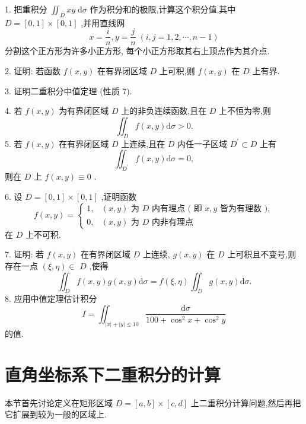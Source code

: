 1. 把重积分 \({\iint }_{D}{xy}\mathrm{\;d}\sigma\) 作为积分和的极限,计算这个积分值,其中 \(D = \left\lbrack  {0,1}\right\rbrack   \times  \left\lbrack  {0,1}\right\rbrack\) ,并用直线网
\[
x = \frac{i}{n},y = \frac{j}{n}\;\left( {i,j = 1,2,\cdots ,n - 1}\right)
\]
分割这个正方形为许多小正方形, 每个小正方形取其右上顶点作为其介点.

2. 证明: 若函数 \(f\left( {x,y}\right)\) 在有界闭区域 \(D\) 上可积,则 \(f\left( {x,y}\right)\) 在 \(D\) 上有界.

3. 证明二重积分中值定理 (性质 7).

4. 若 \(f\left( {x,y}\right)\) 为有界闭区域 \(D\) 上的非负连续函数,且在 \(D\) 上不恒为零,则
\[
{\iint }_{D}f\left( {x,y}\right) \mathrm{d}\sigma  > 0.
\]
5. 若 \(f\left( {x,y}\right)\) 在有界闭区域 \(D\) 上连续,且在 \(D\) 内任一子区域 \({D}^{\prime } \subset  D\) 上有
\[
{\iint }_{{D}^{\prime }}f\left( {x,y}\right) \mathrm{d}\sigma  = 0,
\]
则在 \(D\) 上 \(f\left( {x,y}\right)  \equiv  0\) .

6. 设 \(D = \left\lbrack  {0,1}\right\rbrack   \times  \left\lbrack  {0,1}\right\rbrack\) ,证明函数
\[
f\left( {x,y}\right)  = \left\{  \begin{array}{ll} 1, & \left( {x,y}\right) \text{ 为 }D\text{ 内有理点 ( 即 }x,y\text{ 皆为有理数 }), \\  0, & \left( {x,y}\right) \text{ 为 }D\text{ 内非有理点 } \end{array}\right.
\]
在 \(D\) 上不可积.

7. 证明: 若 \(f\left( {x,y}\right)\) 在有界闭区域 \(D\) 上连续, \(g\left( {x,y}\right)\) 在 \(D\) 上可积且不变号,则存在一点 \(\left( {\xi ,\eta }\right)  \in\)  \(D\) ,使得
\[
{\iint }_{D}f\left( {x,y}\right) g\left( {x,y}\right) \mathrm{d}\sigma  = f\left( {\xi ,\eta }\right) {\iint }_{D}g\left( {x,y}\right) \mathrm{d}\sigma .
\]
8. 应用中值定理估计积分
\[
I = {\iint }_{\left| x\right|  + \left| y\right|  \leq  {10}}\frac{\mathrm{d}\sigma }{{100} + {\cos }^{2}x + {\cos }^{2}y}
\]
的值.

\section{直角坐标系下二重积分的计算}

本节首先讨论定义在矩形区域 \(D = \left\lbrack  {a,b}\right\rbrack   \times  \left\lbrack  {c,d}\right\rbrack\) 上二重积分计算问题,然后再把它扩展到较为一般的区域上.

